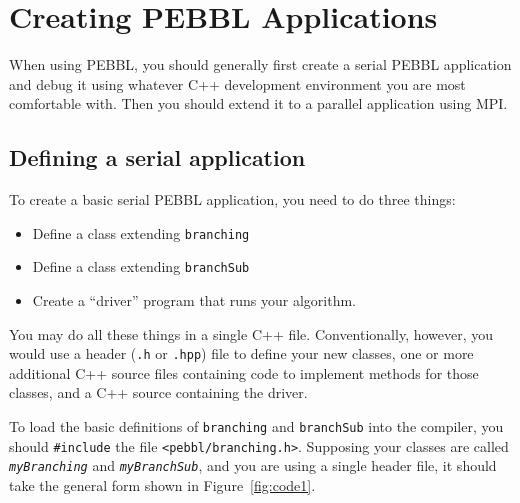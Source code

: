 \section{Creating PEBBL Applications}

When using PEBBL, you should generally first create a serial PEBBL
application and debug it using whatever C++ development environment
you are most comfortable with.  Then you should extend it to a
parallel application using MPI.

\subsection{Defining a serial application}
\label{sec:serialMethods}
To create a basic serial PEBBL application, you need to do three things:
\begin{itemize}
\item Define a class extending \texttt{branching}
\item Define a class extending \texttt{branchSub}
\item Create a ``driver'' program that runs your algorithm.
\end{itemize}
You may do all these things in a single C++ file.  Conventionally,
however, you would use a header (\texttt{.h} or \texttt{.hpp}) file to
define your new classes, one or more additional C++ source files
containing code to implement methods for those classes, and a C++
source containing the driver.  

To load the basic definitions of \texttt{branching} and
\texttt{branchSub} into the compiler, you should \texttt{\#include}
the file \texttt{<pebbl/branching.h>}.  Supposing your classes are
called \texttt{\emph{myBranching}} and \texttt{\emph{myBranchSub}},
and you are using a single header file, it should take the general
form shown in Figure~\ref{fig:code1}.

